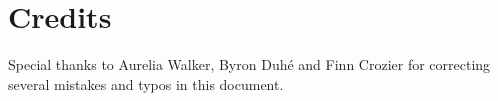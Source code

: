 \section{Credits}

Special thanks to Aurelia Walker, Byron Duh\'{e} and Finn Crozier for correcting several mistakes and typos in this document.